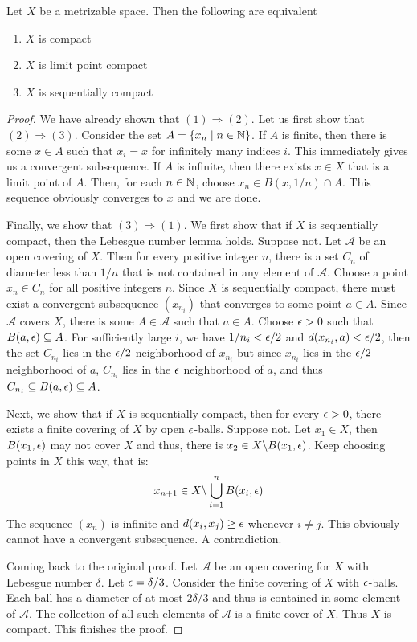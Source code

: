 \begin{theorem}
    Let $X$ be a metrizable space. Then the following are equivalent 
    \begin{enumerate}
        \item $X$ is compact
        \item $X$ is limit point compact
        \item $X$ is sequentially compact
    \end{enumerate}
\end{theorem}
\begin{proof}
    We have already shown that $(1)\Longrightarrow(2)$. Let us first show that $(2)\Longrightarrow(3)$. Consider the set $A = \{x_n\mid n\in\mathbb{N}\}$. If $A$ is finite, then there is some $x\in A$ such that $x_i = x$ for infinitely many indices $i$. This immediately gives us a convergent subsequence. If $A$ is infinite, then there exists $x\in X$ that is a limit point of $A$. Then, for each $n\in\mathbb{N}$, choose $x_n\in B(x, 1/n)\cap A$. This sequence obviously converges to $x$ and we are done.

    Finally, we show that $(3)\Longrightarrow(1)$. We first show that if $X$ is sequentially compact, then the Lebesgue number lemma holds. Suppose not. Let $\mathscr{A}$ be an open covering of $X$. Then for every positive integer $n$, there is a set $C_n$ of diameter less than $1/n$ that is not contained in any element of $\mathscr{A}$. Choose a point $x_n\in C_n$ for all positive integers $n$. Since $X$ is sequentially compact, there must exist a convergent subsequence $(x_{n_i})$ that converges to some point $a\in A$. Since $\mathscr{A}$ covers $X$, there is some $A\in\mathscr{A}$ such that $a\in A$. Choose $\epsilon > 0$ such that $B(a, \epsilon)\subseteq A$. For sufficiently large $i$, we have $1/n_i < \epsilon/2$ and $d(x_{n_i}, a) < \epsilon/2$, then the set $C_{n_i}$ lies in the $\epsilon/2$ neighborhood of $x_{n_i}$ but since $x_{n_i}$ lies in the $\epsilon/2$ neighborhood of $a$, $C_{n_i}$ lies in the $\epsilon$ neighborhood of $a$, and thus $C_{n_i}\subseteq B(a,\epsilon)\subseteq A$. 

    Next, we show that if $X$ is sequentially compact, then for every $\epsilon > 0$, there exists a finite covering of $X$ by open $\epsilon$-balls. Suppose not. Let $x_1\in X$, then $B(x_1,\epsilon)$ may not cover $X$ and thus, there is $x_2\in X\backslash B(x_1,\epsilon)$. Keep choosing points in $X$ this way, that is:
    \begin{equation*}
        x_{n + 1}\in X\backslash\bigcup_{i=1}^n B(x_i, \epsilon)
    \end{equation*}
    The sequence $(x_n)$ is infinite and $d(x_i, x_j)\ge\epsilon$ whenever $i\ne j$. This obviously cannot have a convergent subsequence. A contradiction.

    Coming back to the original proof. Let $\mathscr{A}$ be an open covering for $X$ with Lebesgue number $\delta$. Let $\epsilon = \delta/3$. Consider the finite covering of $X$ with $\epsilon$-balls. Each ball has a diameter of at most $2\delta/3$ and thus is contained in some element of $\mathscr{A}$. The collection of all such elements of $\mathscr{A}$ is a finite cover of $X$. Thus $X$ is compact. This finishes the proof.
\end{proof}

